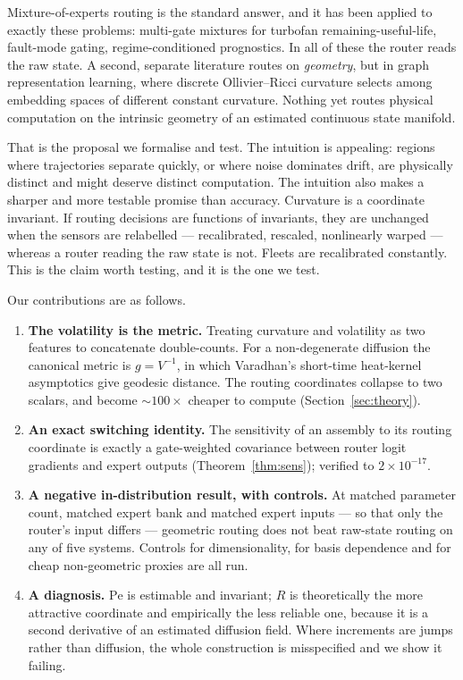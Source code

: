 \documentclass[11pt]{article}
\newcommand{\Pen}{\mathrm{Pe}}
\begin{document}
Mixture-of-experts routing is the standard answer, and it has been applied to
exactly these problems: multi-gate mixtures for turbofan remaining-useful-life,
fault-mode gating, regime-conditioned prognostics. In all of these the router
reads the raw state. A second, separate literature routes on \emph{geometry},
but in graph representation learning, where discrete Ollivier--Ricci curvature
selects among embedding spaces of different constant curvature. Nothing yet
routes physical computation on the intrinsic geometry of an estimated
continuous state manifold.

That is the proposal we formalise and test. The intuition is appealing: regions
where trajectories separate quickly, or where noise dominates drift, are
physically distinct and might deserve distinct computation. The intuition also
makes a sharper and more testable promise than accuracy. Curvature is a
coordinate invariant. If routing decisions are functions of invariants, they
are unchanged when the sensors are relabelled --- recalibrated, rescaled,
nonlinearly warped --- whereas a router reading the raw state is not. Fleets
are recalibrated constantly. This is the claim worth testing, and it is the one
we test.

Our contributions are as follows.

\begin{enumerate}
\item \textbf{The volatility is the metric.} Treating curvature and volatility
as two features to concatenate double-counts. For a non-degenerate diffusion
the canonical metric is $g=V^{-1}$, in which Varadhan's short-time heat-kernel
asymptotics give geodesic distance. The routing coordinates collapse to two
scalars, and become $\sim\!100\times$ cheaper to compute
(Section~\ref{sec:theory}).
\item \textbf{An exact switching identity.} The sensitivity of an assembly to
its routing coordinate is exactly a gate-weighted covariance between router
logit gradients and expert outputs (Theorem~\ref{thm:sens}); verified to
$2\times10^{-17}$.
\item \textbf{A negative in-distribution result, with controls.} At matched
parameter count, matched expert bank and matched expert inputs --- so that only
the router's input differs --- geometric routing does not beat raw-state
routing on any of five systems. Controls for dimensionality, for basis
dependence and for cheap non-geometric proxies are all run.
\item \textbf{A diagnosis.} $\Pen$ is estimable and invariant; $R$ is
theoretically the more attractive coordinate and empirically the less reliable
one, because it is a second derivative of an estimated diffusion field. Where
increments are jumps rather than diffusion, the whole construction is
misspecified and we show it failing.
\end{enumerate}
\end{document}
